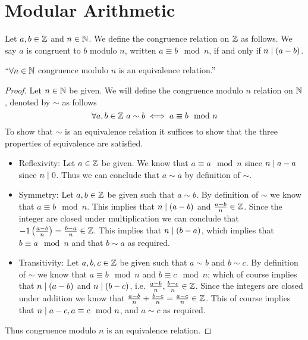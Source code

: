    \section{Modular Arithmetic}
        \begin{definition}
            Let $a, b \in \mathbb{Z}$ and $n \in \mathbb{N}$. We define the congruence relation
            on $\mathbb{Z}$ as follows. We say $a$ is congruent to $b$ modulo
            $n$, written $a \equiv b \mod n$, if and only if $n \mid (a - b)$.
        \end{definition}
        \begin{lemma}
            $``\forall n \in \mathbb{N}$ congruence modulo $n$ is an equivalence relation.''
            \label{Congruence Equivalence Relation}
        \end{lemma}
        \begin{proof}
            Let $n \in \mathbb{N}$ be given. We will define the congruence modulo $n$ relation 
            on $\mathbb{N}$, denoted by $\sim$ as follows
            \begin{equation}
                \forall a, b \in \mathbb{Z} \ a \sim b \iff a \equiv b \mod n
            \end{equation}
            To show that $\sim$ is an equivalence relation it suffices to show that
            the three properties of equivalence are satisfied.
            \begin{itemize}
                \item
                    Reflexivity: Let $a \in \mathbb{Z}$ be given. We know that $a \equiv a \mod n$
                    since $n \mid a - a$ since $n \mid 0$. Thus we can conclude that
                    $a \sim a$ by definition of $\sim$.
                \item
                    Symmetry: Let $a, b \in \mathbb{Z}$ be given such that $a \sim b$. By definition
                    of $\sim$ we know that $a \equiv b \mod n$. This implies that $n \mid (a - b)$
                    and $\frac{a - b}{n} \in \mathbb{Z}$. Since the integer are closed under multiplication
                    we can conclude that $-1 \left(\frac{a - b}{n}\right) = \frac{b - a}{n} \in \mathbb{Z}$.
                    This implies that $n \mid (b - a)$, which implies that $b \equiv a \mod n$ and
                    that $b \sim a$ as required.
                \item
                    Transitivity: Let $a, b, c \in \mathbb{Z}$ be given such that $a \sim b$ and 
                    $b \sim c$. By definition of $\sim$ we know that $a \equiv b \mod n$ and 
                    $b \equiv c \mod n$; which of course implies that $n \mid (a - b)$
                    and $n \mid (b - c)$, i.e. $\frac{a - b}{n}, \frac{b - c}{n} \in \mathbb{Z}$.
                    Since the integers are closed under addition we know that 
                    $\frac{a - b}{n} + \frac{b - c}{n} = \frac{a - c}{n} \in \mathbb{Z}$.
                    This of course implies that $n \mid a - c, a \equiv c \mod n$, and
                    $a \sim c$ as required.
            \end{itemize}
            Thus congruence modulo $n$ is an equivalence relation. \QED
        \end{proof}
